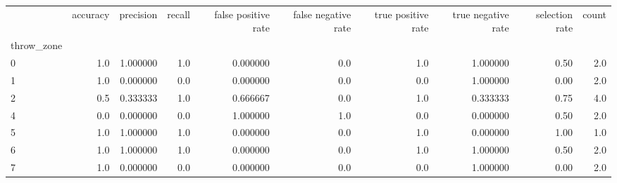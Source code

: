 \begin{tabular}{lrrrrrrrrr}
\toprule
{} &  accuracy &  precision &  recall &  false positive rate &  false negative rate &  true positive rate &  true negative rate &  selection rate &  count \\
throw\_zone &           &            &         &                      &                      &                     &                     &                 &        \\
\midrule
0          &       1.0 &   1.000000 &     1.0 &             0.000000 &                  0.0 &                 1.0 &            1.000000 &            0.50 &    2.0 \\
1          &       1.0 &   0.000000 &     0.0 &             0.000000 &                  0.0 &                 0.0 &            1.000000 &            0.00 &    2.0 \\
2          &       0.5 &   0.333333 &     1.0 &             0.666667 &                  0.0 &                 1.0 &            0.333333 &            0.75 &    4.0 \\
4          &       0.0 &   0.000000 &     0.0 &             1.000000 &                  1.0 &                 0.0 &            0.000000 &            0.50 &    2.0 \\
5          &       1.0 &   1.000000 &     1.0 &             0.000000 &                  0.0 &                 1.0 &            0.000000 &            1.00 &    1.0 \\
6          &       1.0 &   1.000000 &     1.0 &             0.000000 &                  0.0 &                 1.0 &            1.000000 &            0.50 &    2.0 \\
7          &       1.0 &   0.000000 &     0.0 &             0.000000 &                  0.0 &                 0.0 &            1.000000 &            0.00 &    2.0 \\
\bottomrule
\end{tabular}
